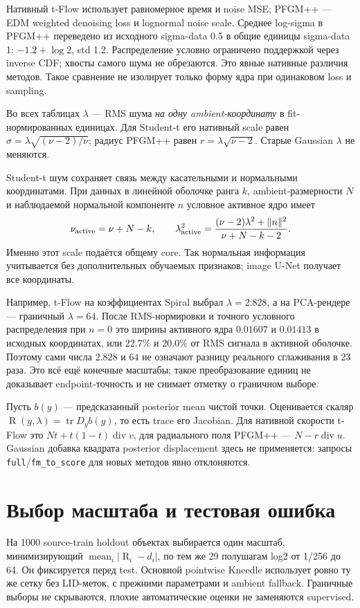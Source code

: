 \documentclass[10pt,a4paper]{article}
\newcommand{\R}{\operatorname{R}}
\begin{document}
Нативный t-Flow использует равномерное время и noise MSE; PFGM++ --- EDM weighted
denoising loss и lognormal noise scale. Среднее log-sigma в PFGM++ переведено
из исходного sigma-data 0.5 в общие единицы sigma-data 1: $-1.2+\log2$, std 1.2.
Распределение условно ограничено поддержкой через inverse CDF; хвосты самого
шума не обрезаются. Это явные нативные различия методов. Такое сравнение
не изолирует только форму ядра при одинаковом loss и sampling.

Во всех таблицах $\lambda$ --- RMS шума \emph{на одну ambient-координату}
в fit-нормированных единицах. Для Student-t его нативный scale равен
$\sigma=\lambda\sqrt{(\nu-2)/\nu}$; радиус PFGM++ равен
$r=\lambda\sqrt{\nu-2}$. Старые Gaussian $\lambda$ не меняются.

Student-t шум сохраняет связь между касательными и нормальными координатами.
При данных в линейной оболочке ранга $k$, ambient-размерности $N$ и наблюдаемой
нормальной компоненте $n$ условное активное ядро имеет
\[
\nu_{\rm active}=\nu+N-k,\qquad
\lambda_{\rm active}^2=
\frac{(\nu-2)\lambda^2+\|n\|^2}{\nu+N-k-2}.
\]
Именно этот scale подаётся общему core. Так нормальная информация учитывается
без дополнительных обучаемых признаков; image U-Net получает все координаты.

Например, t-Flow на коэффициентах Spiral выбрал $\lambda=2.828$, а на PCA-рендере
--- граничный $\lambda=64$. После RMS-нормировки и точного условного распределения
при $n=0$ это ширины активного ядра $0.01607$ и $0.01413$ в исходных координатах,
или $22.7\%$ и $20.0\%$ от RMS сигнала в активной оболочке. Поэтому сами числа
$2.828$ и $64$ не означают разницу реального сглаживания в 23 раза. Это всё ещё
конечные масштабы; такое преобразование единиц не доказывает endpoint-точность
и не снимает отметку о граничном выборе.

Пусть $b(y)$ --- предсказанный posterior mean чистой точки. Оценивается скаляр
$\R(y,\lambda)=\operatorname{tr}D_y b(y)$, то есть trace его Jacobian.
Для нативной скорости t-Flow это $Nt+t(1-t)\operatorname{div}v$, для радиального
поля PFGM++ --- $N-r\operatorname{div}u$. Gaussian добавка квадрата posterior
displacement здесь не применяется: запросы \texttt{full}/\texttt{fm\_to\_score}
для новых методов явно отклоняются.

\section*{Выбор масштаба и тестовая ошибка}
На 1000 source-train holdout объектах выбирается один масштаб, минимизирующий
$\operatorname{mean}_i|\R_i-d_i|$, по тем же 29 полушагам log2 от 1/256 до 64.
Он фиксируется перед test. Основной pointwise Kneedle использует ровно ту же
сетку без LID-меток, с прежними параметрами и ambient fallback. Граничные
выборы не скрываются, плохие автоматические оценки не заменяются supervised.
\end{document}
